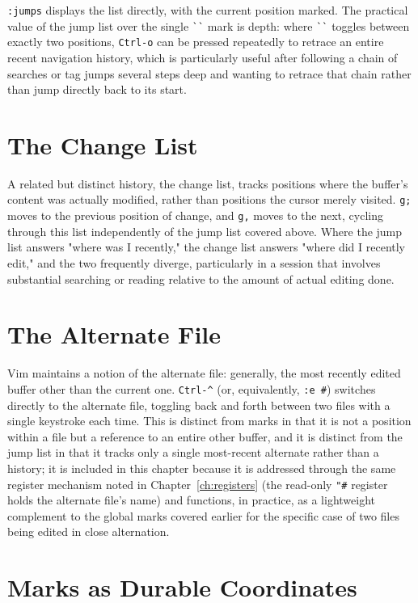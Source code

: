 \texttt{:jumps} displays the list directly, with the current position marked. The practical value of the jump list over the single \verb|``| mark is depth: where \verb|``| toggles between exactly two positions, \texttt{Ctrl-o} can be pressed repeatedly to retrace an entire recent navigation history, which is particularly useful after following a chain of searches or tag jumps several steps deep and wanting to retrace that chain rather than jump directly back to its start.

\section{The Change List}

A related but distinct history, the change list, tracks positions where the buffer's content was actually modified, rather than positions the cursor merely visited. \texttt{g;} moves to the previous position of change, and \texttt{g,} moves to the next, cycling through this list independently of the jump list covered above. Where the jump list answers "where was I recently," the change list answers "where did I recently edit," and the two frequently diverge, particularly in a session that involves substantial searching or reading relative to the amount of actual editing done.

\section{The Alternate File}

Vim maintains a notion of the alternate file: generally, the most recently edited buffer other than the current one. \texttt{Ctrl-\textasciicircum} (or, equivalently, \texttt{:e \#}) switches directly to the alternate file, toggling back and forth between two files with a single keystroke each time. This is distinct from marks in that it is not a position within a file but a reference to an entire other buffer, and it is distinct from the jump list in that it tracks only a single most-recent alternate rather than a history; it is included in this chapter because it is addressed through the same register mechanism noted in Chapter~\ref{ch:registers} (the read-only \texttt{"\#} register holds the alternate file's name) and functions, in practice, as a lightweight complement to the global marks covered earlier for the specific case of two files being edited in close alternation.

\section{Marks as Durable Coordinates}

